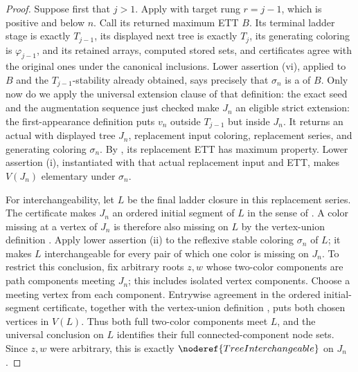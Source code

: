 \begin{proof}
Suppose first that $j>1$.  Apply
 with target rung $r=j-1$, which is
positive and below $n$.  Call its returned maximum ETT $B$.  Its terminal
ladder stage is exactly $T_{j-1}$, its displayed next tree is exactly
$T_j$, its generating coloring is $\varphi_{j-1}$, and its retained
arrays, computed stored sets, and certificates agree with the original
ones under the canonical inclusions.  Lower assertion (vi), applied to
$B$ and the $T_{j-1}$-stability already obtained, says precisely that
$\sigma_n$ is a  of $B$.  Only now do we apply the
universal extension clause of that definition: the exact seed and the
augmentation sequence just checked make $J_n$ an eligible strict
extension: the first-appearance definition puts $v_n$ outside
$T_{j-1}$ but inside $J_n$.  It returns an actual
 with displayed tree $J_n$,
replacement input coloring, replacement series, and generating coloring
$\sigma_n$.  By , its replacement ETT
has maximum property.  Lower assertion (i), instantiated with that actual
replacement input and ETT, makes $V(J_n)$ elementary under $\sigma_n$.

For interchangeability, let $L$ be the final ladder closure in this
replacement series.  The  certificate makes
$J_n$ an ordered initial segment of $L$ in the sense of
.  A color missing at a vertex of
$J_n$ is therefore also missing on $L$ by the vertex-union definition
.  Apply lower assertion (ii) to the reflexive
stable coloring $\sigma_n$ of $L$; it makes $L$ interchangeable for every
pair of which one color is missing on $J_n$.  To restrict this conclusion,
fix arbitrary roots $z,w$ whose two-color components are path components
meeting $J_n$; this includes isolated vertex components.  Choose a meeting
vertex from each component.  Entrywise agreement in the ordered
initial-segment certificate, together with the vertex-union definition
, puts both chosen vertices in $V(L)$.
Thus both full two-color components meet $L$, and the universal
 conclusion on $L$ identifies their full
connected-component node sets.  Since $z,w$ were arbitrary, this is exactly
$\noderef{TreeInterchangeable}$ on $J_n$.


\end{proof}
